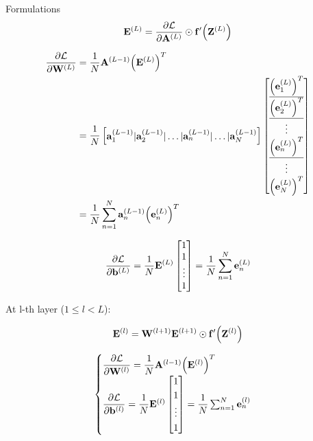 \documentclass[10pt]{beamer}
\theoremstyle{remark}
\theoremstyle{definition}
\begin{document}
\begin{frame}[allowframebreaks]{Formulations}
	\begin{equation}
		\bold{E}^{(L)}=\dfrac{\partial \mathcal{L}}{\partial \bold{A}^{(L)}} \odot \bold{f}^{\prime}\Big( \bold{Z}^{(L)} \Big)
	\end{equation}

	\begin{equation}
		\begin{aligned}
			\dfrac{\partial \mathcal{L}}{\partial \bold{W}^{(L)}}&=\dfrac{1}{N}\bold{A}^{(L-1)} \Big(\bold{E}^{(L)}\Big)^T\\&=\dfrac{1}{N}\begin{bmatrix} \bold{a}_1^{(L-1)} \vert \bold{a}_2^{(L-1)} \vert \dots \vert \bold{a}_n^{(L-1)} \vert \dots \vert \bold{a}_N^{(L-1)} \end{bmatrix}\begin{bmatrix} \underline{\Big(\bold{e}_1^{(L)}\Big)^T} \\ \underline{\Big(\bold{e}_2^{(L)}\Big)^T} \\ \vdots \\ \underline{\Big(\bold{e}_n^{(L)}\Big)^T} \\ \vdots \\ \Big(\bold{e}_N^{(L)}\Big)^T \end{bmatrix}\\&=\dfrac{1}{N}\sum_{n=1}^{N} \bold{a}_n^{(L-1)}\Big(\bold{e}_n^{(L)}\Big)^T
		\end{aligned}
	\end{equation}

	\begin{equation}
		\dfrac{\partial \mathcal{L}}{\partial \bold{b}^{(L)}}=\dfrac{1}{N}\bold{E}^{(L)}\begin{bmatrix} 1 \\ 1 \\ \vdots \\ 1 \end{bmatrix}=\dfrac{1}{N}\sum_{n=1}^{N}\bold{e}_n^{(L)}
	\end{equation}

	At l-th layer ($1 \leq l < L$):

	\begin{equation}
		\bold{E}^{(l)}=\bold{W}^{(l+1)}\bold{E}^{(l+1)}\odot \bold{f}^{\prime}\Big( \bold{Z}^{(l)} \Big)
	\end{equation}

	\begin{equation}
		\begin{cases}\dfrac{\partial \mathcal{L}}{\partial \bold{W}^{(l)}}=\dfrac{1}{N}\bold{A}^{(l-1)}\Big(\bold{E}^{(l)}\Big)^T \\ \dfrac{\partial \mathcal{L}}{\partial \bold{b}^{(l)}}=\dfrac{1}{N}\bold{E}^{(l)}\begin{bmatrix} 1 \\ 1 \\ \vdots \\ 1 \end{bmatrix}=\dfrac{1}{N}\sum_{n=1}^{N}\bold{e}_n^{(l)} \end{cases}
	\end{equation}


\end{frame}
\end{document}
